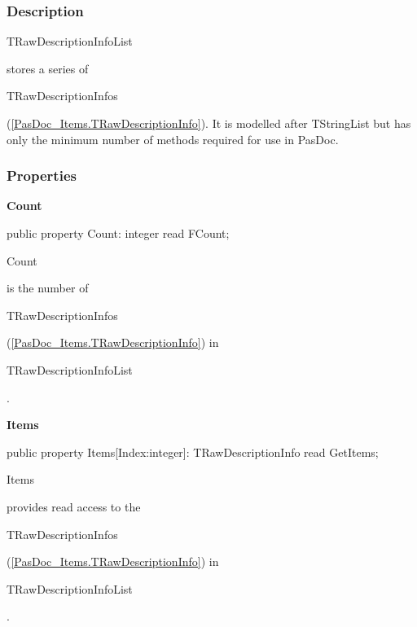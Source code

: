 \documentclass{report}
\newif\ifpdf
\begin{document}
\subsubsection*{\large{\textbf{Description}}\normalsize\hspace{1ex}\hfill}
\begin{ttfamily}TRawDescriptionInfoList\end{ttfamily} stores a series of \begin{ttfamily}TRawDescriptionInfos\end{ttfamily}(\ref{PasDoc_Items.TRawDescriptionInfo}). It is modelled after TStringList but has only the minimum number of methods required for use in PasDoc.\subsubsection*{\large{\textbf{Properties}}\normalsize\hspace{1ex}\hfill}
\begin{list}{}{
\setlength{\itemindent}{0cm}
\setlength{\listparindent}{0cm}
\setlength{\leftmargin}{\evensidemargin}
\addtolength{\leftmargin}{\tmplength}
\settowidth{\labelsep}{X}
\addtolength{\leftmargin}{\labelsep}
\setlength{\labelwidth}{\tmplength}
}
\label{PasDoc_Parser.TRawDescriptionInfoList-Count}
\item[\textbf{Count}\hfill]
\ifpdf
\begin{flushleft}
\fi
\begin{ttfamily}
public property Count: integer read FCount;\end{ttfamily}

\ifpdf
\end{flushleft}
\fi


\par \begin{ttfamily}Count\end{ttfamily} is the number of \begin{ttfamily}TRawDescriptionInfos\end{ttfamily}(\ref{PasDoc_Items.TRawDescriptionInfo}) in \begin{ttfamily}TRawDescriptionInfoList\end{ttfamily}.\label{PasDoc_Parser.TRawDescriptionInfoList-Items}
\item[\textbf{Items}\hfill]
\ifpdf
\begin{flushleft}
\fi
\begin{ttfamily}
public property Items[Index:integer]: TRawDescriptionInfo read GetItems;\end{ttfamily}

\ifpdf
\end{flushleft}
\fi


\par \begin{ttfamily}Items\end{ttfamily} provides read access to the \begin{ttfamily}TRawDescriptionInfos\end{ttfamily}(\ref{PasDoc_Items.TRawDescriptionInfo}) in \begin{ttfamily}TRawDescriptionInfoList\end{ttfamily}.\end{list}
\end{document}
